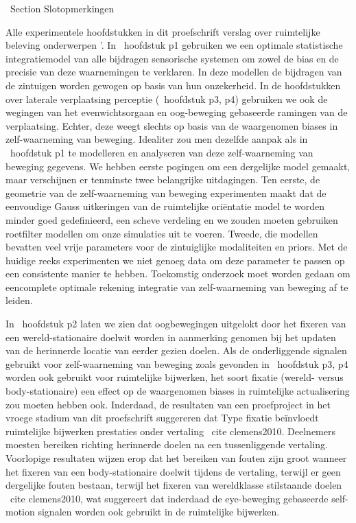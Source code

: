 \ Section {Slotopmerkingen}

Alle experimentele hoofdstukken in dit proefschrift verslag over ruimtelijke beleving onderwerpen '. In \ hoofdstuk {p1} gebruiken we een optimale statistische integratiemodel van alle bijdragen sensorische systemen om zowel de bias en de precisie van deze waarnemingen te verklaren. In deze modellen de bijdragen van de zintuigen worden gewogen op basis van hun onzekerheid. In de hoofdstukken over laterale verplaatsing perceptie (\ hoofdstuk {p3, p4}) gebruiken we ook de wegingen van het evenwichtsorgaan en oog-beweging gebaseerde ramingen van de verplaatsing. Echter, deze weegt slechts op basis van de waargenomen biases in zelf-waarneming van beweging. Idealiter zou men dezelfde aanpak als in \ hoofdstuk {p1} te modelleren en analyseren van deze zelf-waarneming van beweging gegevens. We hebben eerste pogingen om een ​​dergelijke model gemaakt, maar verschijnen er tenminste twee belangrijke uitdagingen. Ten eerste, de geometrie van de zelf-waarneming van beweging experimenten maakt dat de eenvoudige Gauss uitkeringen van de ruimtelijke oriëntatie model te worden minder goed gedefinieerd, een scheve verdeling en we zouden moeten gebruiken roetfilter modellen om onze simulaties uit te voeren. Tweede, die modellen bevatten veel vrije parameters voor de zintuiglijke modaliteiten en priors. Met de huidige reeks experimenten we niet genoeg data om deze parameter te passen op een consistente manier te hebben. Toekomstig onderzoek moet worden gedaan om een ​​complete optimale rekening integratie van zelf-waarneming van beweging af te leiden.

In \ hoofdstuk {p2} laten we zien dat oogbewegingen uitgelokt door het fixeren van een wereld-stationaire doelwit worden in aanmerking genomen bij het updaten van de herinnerde locatie van eerder gezien doelen. Als de onderliggende signalen gebruikt voor zelf-waarneming van beweging zoals gevonden in \ hoofdstuk {p3, p4} worden ook gebruikt voor ruimtelijke bijwerken, het soort fixatie (wereld- versus body-stationaire) een effect op de waargenomen biases in ruimtelijke actualisering zou moeten hebben ook. Inderdaad, de resultaten van een proefproject in het vroege stadium van dit proefschrift suggereren dat Type fixatie beïnvloedt ruimtelijke bijwerken prestaties onder vertaling \ cite {clemens2010}. Deelnemers moesten bereiken richting herinnerde doelen na een tussenliggende vertaling. Voorlopige resultaten wijzen erop dat het bereiken van fouten zijn groot wanneer het fixeren van een body-stationaire doelwit tijdens de vertaling, terwijl er geen dergelijke fouten bestaan, terwijl het fixeren van wereldklasse stilstaande doelen \ cite {clemens2010}, wat suggereert dat inderdaad de eye-beweging gebaseerde self-motion signalen worden ook gebruikt in de ruimtelijke bijwerken.


